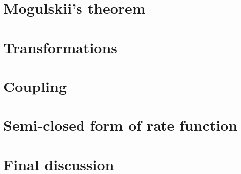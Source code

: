 

\section{Mogulskii's theorem}
\label{rate-functions:mogulskii}


\section{Transformations}
\label{rate-functions:transformations}


\section{Coupling}
\label{rate-functions:coupling}


\section{Semi-closed form of rate function}
\label{rate-functions:main}


\section{Final discussion}
\label{rate-functions:final}

